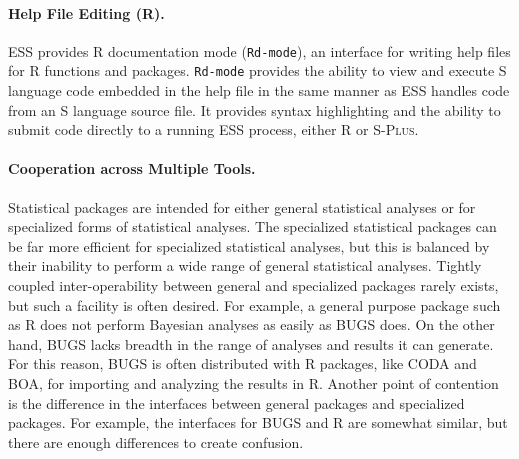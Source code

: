 \documentclass{article}
\newcommand*{\Splus}{\textsc{S-Plus}}
\newcommand{\stexttt}[1]{{\small\texttt{#1}}}
\begin{document}
\paragraph{Help File Editing (R).}
ESS provides R documentation mode (\stexttt{Rd-mode}), an interface
for writing help files for R functions and packages.
\stexttt{Rd-mode} provides the ability to view and execute S language
code embedded in the help file in the same manner as ESS handles code
from an S language source file.  It provides syntax highlighting and
the ability to submit code directly to a running ESS process, either R or
\Splus.



\paragraph{Cooperation across Multiple Tools.}
\label{sec:multiple-tools}

Statistical packages are intended for either general
statistical analyses or for specialized forms of statistical analyses.
The specialized statistical packages can be far more efficient for
specialized statistical analyses, but this is balanced by their inability
to perform a wide range of general statistical analyses.  Tightly coupled
inter-operability between general and specialized packages rarely exists,
but such a facility is often desired.  For example, a general purpose
package such as R does not perform Bayesian analyses as easily as BUGS does.
On the other hand, BUGS lacks breadth in the range of analyses and results
it can generate.  For this reason, BUGS is often distributed with R packages,
like CODA and BOA, for importing and analyzing the results in R.  Another
point of contention is the difference in the interfaces between general
packages and specialized packages.  For example, the interfaces for BUGS
and R are somewhat similar, but there are enough differences to create confusion.
\end{document}
